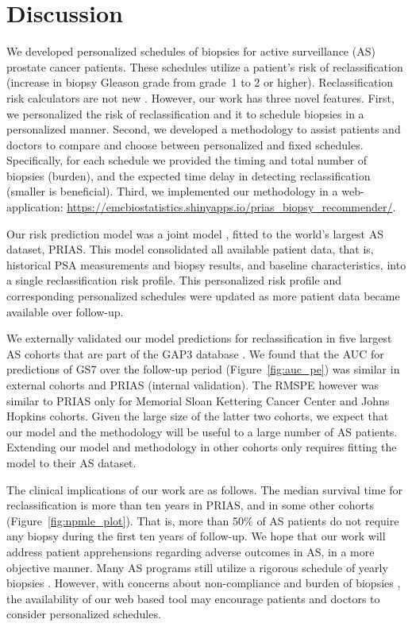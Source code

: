 \section{Discussion}
We developed personalized schedules of biopsies for active surveillance (AS) prostate cancer patients. These schedules utilize a patient's risk of reclassification (increase in biopsy Gleason grade \citep{epsteinGG2014} from grade~1 to 2 or higher). Reclassification risk calculators are not new \citep{coley2017prediction,ankerst2015precision}. However, our work has three novel features. First, we personalized the risk of reclassification and it to schedule biopsies in a personalized manner. Second, we developed a methodology to assist patients and doctors to compare and choose between personalized and fixed schedules. Specifically, for each schedule we provided the timing and total number of biopsies (burden), and the expected time delay in detecting reclassification (smaller is beneficial). Third, we implemented our methodology in a web-application: \url{https://emcbiostatistics.shinyapps.io/prias_biopsy_recommender/}.

Our risk prediction model was a joint model \citep{rizopoulos2012joint,tsiatis2004joint}, fitted to the world's largest AS dataset, PRIAS. This model consolidated all available patient data, that is, historical PSA measurements and biopsy results, and baseline characteristics, into a single reclassification risk profile. This personalized risk profile and corresponding personalized schedules were updated as more patient data became available over follow-up.

We externally validated our model predictions for reclassification in five largest AS cohorts that are part of the GAP3 database \citep{gap3_2018}. We found that the AUC for predictions of GS7 over the follow-up period (Figure~\ref{fig:auc_pe}) was similar in external cohorts and PRIAS (internal validation). The RMSPE however was similar to PRIAS only for Memorial Sloan Kettering Cancer Center and Johns Hopkins cohorts. Given the large size of the latter two cohorts, we expect that our model and the methodology will be useful to a large number of AS patients. Extending our model and methodology in other cohorts only requires fitting the model to their AS dataset.

The clinical implications of our work are as follows. The median survival time for reclassification is more than ten years in PRIAS, and in some other cohorts (Figure~\ref{fig:npmle_plot}). That is, more than 50\% of AS patients do not require any biopsy during the first ten years of follow-up. We hope that our work will address patient apprehensions regarding adverse outcomes in AS, in a more objective manner. Many AS programs still utilize a rigorous schedule of yearly biopsies \citep{nieboer2018active}. However, with concerns about non-compliance and burden of biopsies \citep{bokhorst2015compliance}, the availability of our web based tool may encourage patients and doctors to consider personalized schedules.

